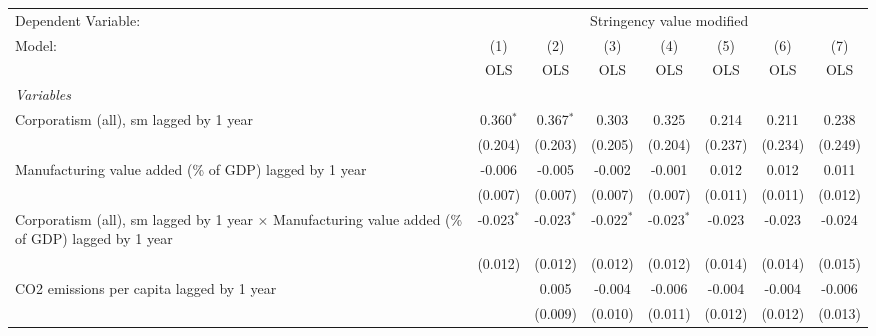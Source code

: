 
\begingroup
\centering
\begin{tabular}{lccccccc}
   \toprule
   Dependent Variable: & \multicolumn{7}{c}{Stringency value modified}\\
   Model:                                                                                                   & (1)          & (2)          & (3)          & (4)          & (5)          & (6)          & (7)\\  
                                                                                                            &  OLS         & OLS          & OLS          & OLS          & OLS          & OLS          & OLS\\  
   \midrule
   \emph{Variables}\\
   Corporatism (all), sm lagged by 1 year                                                                   & 0.360$^{*}$  & 0.367$^{*}$  & 0.303        & 0.325        & 0.214        & 0.211        & 0.238\\   
                                                                                                            & (0.204)      & (0.203)      & (0.205)      & (0.204)      & (0.237)      & (0.234)      & (0.249)\\   
   Manufacturing value added (\% of GDP) lagged by 1 year                                                   & -0.006       & -0.005       & -0.002       & -0.001       & 0.012        & 0.012        & 0.011\\   
                                                                                                            & (0.007)      & (0.007)      & (0.007)      & (0.007)      & (0.011)      & (0.011)      & (0.012)\\   
   Corporatism (all), sm lagged by 1 year $\times$ Manufacturing value added (\% of GDP) lagged by 1 year   & -0.023$^{*}$ & -0.023$^{*}$ & -0.022$^{*}$ & -0.023$^{*}$ & -0.023       & -0.023       & -0.024\\   
                                                                                                            & (0.012)      & (0.012)      & (0.012)      & (0.012)      & (0.014)      & (0.014)      & (0.015)\\   
   CO2 emissions per capita lagged by 1 year                                                                &              & 0.005        & -0.004       & -0.006       & -0.004       & -0.004       & -0.006\\   
                                                                                                            &              & (0.009)      & (0.010)      & (0.011)      & (0.012)      & (0.012)      & (0.013)\\   

\end{tabular}
